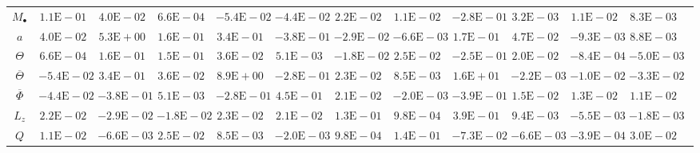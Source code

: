 \begin{sidewaystable}[htbp]\footnotesize
\centering
\begin{tabular}{cD{.}{.}{2.5}D{.}{.}{2.5}D{.}{.}{2.5}D{.}{.}{2.5}D{.}{.}{2.5}D{.}{.}{2.5}D{.}{.}{2.5}D{.}{.}{2.5}D{.}{.}{2.5}D{.}{.}{2.5}D{.}{.}{2.5}c}
\toprule
 &  &  &  &  &  &  &  &  &  &  &  \\ \midrule
$M_\bullet$ & $1.1\mathrm{E}-01$ & $4.0\mathrm{E}-02$ & $6.6\mathrm{E}-04$ & $-5.4\mathrm{E}-02$ & $-4.4\mathrm{E}-02$ & $2.2\mathrm{E}-02$ & $1.1\mathrm{E}-02$ & $-2.8\mathrm{E}-01$ & $3.2\mathrm{E}-03$ & $1.1\mathrm{E}-02$ & $8.3\mathrm{E}-03$ \\
$a$ & $4.0\mathrm{E}-02$ & $5.3\mathrm{E}+00$ & $1.6\mathrm{E}-01$ & $3.4\mathrm{E}-01$ & $-3.8\mathrm{E}-01$ & $-2.9\mathrm{E}-02$ & $-6.6\mathrm{E}-03$ & $1.7\mathrm{E}-01$ & $4.7\mathrm{E}-02$ & $-9.3\mathrm{E}-03$ & $8.8\mathrm{E}-03$ \\
$\Theta$ & $6.6\mathrm{E}-04$ & $1.6\mathrm{E}-01$ & $1.5\mathrm{E}-01$ & $3.6\mathrm{E}-02$ & $5.1\mathrm{E}-03$ & $-1.8\mathrm{E}-02$ & $2.5\mathrm{E}-02$ & $-2.5\mathrm{E}-01$ & $2.0\mathrm{E}-02$ & $-8.4\mathrm{E}-04$ & $-5.0\mathrm{E}-03$ \\
$\overline{\Theta}$ & $-5.4\mathrm{E}-02$ & $3.4\mathrm{E}-01$ & $3.6\mathrm{E}-02$ & $8.9\mathrm{E}+00$ & $-2.8\mathrm{E}-01$ & $2.3\mathrm{E}-02$ & $8.5\mathrm{E}-03$ & $1.6\mathrm{E}+01$ & $-2.2\mathrm{E}-03$ & $-1.0\mathrm{E}-02$ & $-3.3\mathrm{E}-02$ \\
$\overline{\Phi}$ & $-4.4\mathrm{E}-02$ & $-3.8\mathrm{E}-01$ & $5.1\mathrm{E}-03$ & $-2.8\mathrm{E}-01$ & $4.5\mathrm{E}-01$ & $2.1\mathrm{E}-02$ & $-2.0\mathrm{E}-03$ & $-3.9\mathrm{E}-01$ & $1.5\mathrm{E}-02$ & $1.3\mathrm{E}-02$ & $1.1\mathrm{E}-02$ \\
$L_z$ & $2.2\mathrm{E}-02$ & $-2.9\mathrm{E}-02$ & $-1.8\mathrm{E}-02$ & $2.3\mathrm{E}-02$ & $2.1\mathrm{E}-02$ & $1.3\mathrm{E}-01$ & $9.8\mathrm{E}-04$ & $3.9\mathrm{E}-01$ & $9.4\mathrm{E}-03$ & $-5.5\mathrm{E}-03$ & $-1.8\mathrm{E}-03$ \\
$Q$ & $1.1\mathrm{E}-02$ & $-6.6\mathrm{E}-03$ & $2.5\mathrm{E}-02$ & $8.5\mathrm{E}-03$ & $-2.0\mathrm{E}-03$ & $9.8\mathrm{E}-04$ & $1.4\mathrm{E}-01$ & $-7.3\mathrm{E}-02$ & $-6.6\mathrm{E}-03$ & $-3.9\mathrm{E}-04$ & $3.0\mathrm{E}-02$ \\

\end{tabular}
\end{sidewaystable}
